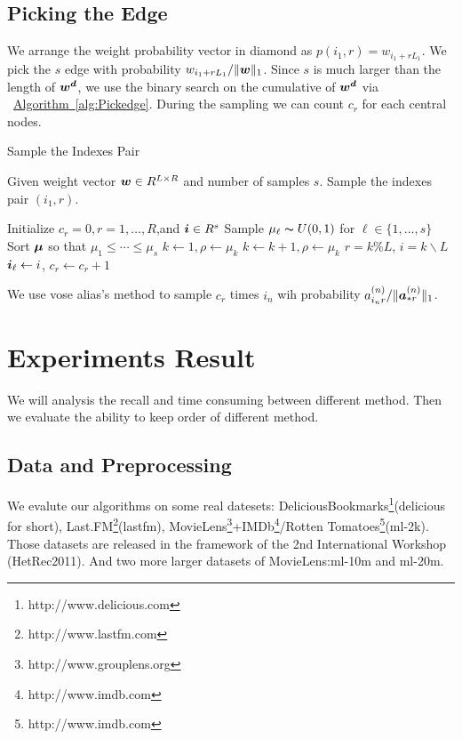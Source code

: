 \documentclass[letterpaper]{article}
\newcommand{\Sca}[3]{{#1}^{(#2)}_{i_#2#3}}%
\newcommand{\V}[1]{{\bm{{\MakeLowercase{#1}}}}}
\newcommand{\VnC}[3]{\V{#1}^{(#2)}_{#3}}
\newcommand{\Nrocl}[2]{\norm{\VnC{a}{#1}{*#2}}{1}}
\newcommand{\norm}[2]{\|#1\|_{#2}}
\newcommand{\Alg}[1] {\hyperref[alg:#1] {Algorithm~\ref*{alg:#1}}}
\begin{document}
\subsection{Picking the Edge}
We arrange the weight probability vector in diamond as $p(i_1,r) = w_{i_1+rL_1}$.
We pick the $s$ edge with probability  $w_{i_1+rL_1}/\norm{\V{W}}{1}$. Since $s$ is much larger than the length of $\V{w^d}$, we use the binary search on the cumulative of $\V{w^d}$ via ~\Alg{Pickedge}. During the sampling we can count $c_r$ for each central nodes.

\begin{algorithm}[ht]
    \caption{Sample the Indexes Pair}
    \label{alg:Pickedge}
    Given weight vector $\V{W}\in R^{L\times R}$ and number of samples $s$. Sample the indexes pair $(i_1,r)$.
    \begin{algorithmic}[1]
    \State Initialize $c_r=0,r=1,\ldots,R$,and $\V{i}\in R^s$
    \State Sample $\mu_{\ell} \thicksim U(0,1)$ for $\ell \in \{1,\ldots,s\}$
    \State Sort $\V{\mu}$ so that $\mu_1 \leq \cdots\leq\mu_s$
    \State $k \leftarrow 1,\rho \leftarrow \mu_k$
    \State $k \leftarrow k+1,\rho \leftarrow \mu_k$
    \EndWhile
    \State $r = k \% L$, $i = k \backslash L$
    \State $\V{i}_{\ell} \leftarrow i$, $c_r\leftarrow c_r + 1$
    \EndFor
    \end{algorithmic}
\end{algorithm}

We use vose alias's method to sample $c_r$ times $i_n$ wih probability ${\Sca{a}{n}{r}}/\Nrocl{n}{r}$.

\section{Experiments Result}
We will analysis the recall and time consuming  between different method. Then we evaluate the ability to keep order of different method.
\subsection{Data and Preprocessing}
We evalute our algorithms on some real datesets:
DeliciousBookmarks\footnote{http://www.delicious.com
}(delicious for short), 
Last.FM\footnote{http://www.lastfm.com}(lastfm),
MovieLens\footnote{http://www.grouplens.org}+IMDb\footnote{http://www.imdb.com }/Rotten Tomatoes\footnote{http://www.imdb.com}(ml-2k).
Those datasets are released in the framework of the 2nd International Workshop (HetRec2011)\cite{Cantador:RecSys2011}. 
And two more larger datasets of MovieLens\cite{Harper2015}:ml-10m and ml-20m.
\end{document}
